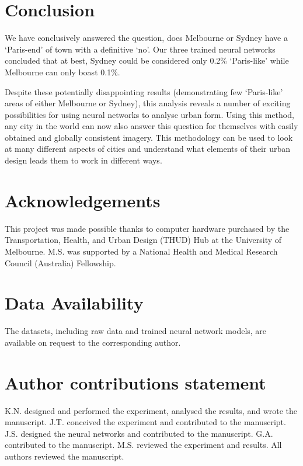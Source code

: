 \documentclass[Crown,sageh,times]{sagej}
\begin{document}

\section{Conclusion}\label{sec:conclusion}

We have conclusively answered the question, does Melbourne or Sydney have a `Paris-end' of town with a definitive `no'. Our three trained neural networks concluded that at best, Sydney could be considered only 0.2\% `Paris-like' while Melbourne can only boast 0.1\%.   

Despite these potentially disappointing results (demonstrating few `Paris-like' areas of either Melbourne or Sydney), this analysis reveals a number of exciting possibilities for using neural networks to analyse urban form. Using this method, any city in the world can now also answer this question for themselves with easily obtained and globally consistent imagery. This methodology can be used to look at many different aspects of cities and understand what elements of their urban design leads them to work in different ways.

\section{Acknowledgements}
This project was made possible thanks to computer hardware purchased by the Transportation, Health, and Urban Design (THUD) Hub at the University of Melbourne. M.S. was supported by a National Health and Medical Research Council (Australia) Fellowship.

\section{Data Availability}\label{sec:methods6} 
The datasets, including raw data and trained neural network models, are available on request to the corresponding author.

\section{Author contributions statement}

K.N. designed and performed the experiment, analysed the results, and wrote the manuscript. J.T. conceived the experiment and contributed to the manuscript. J.S. designed the neural networks and contributed to the manuscript. G.A. contributed to the manuscript. M.S. reviewed the experiment and results. All authors reviewed the manuscript. 
\end{document}
